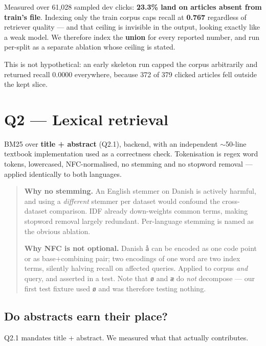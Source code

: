 \documentclass[11pt,a4paper]{article}
\newcommand{\brk}[1]{%
  \begingroup\ttfamily\hyphenchar\font=-1
  \discretionary{}{}{}%
  \expandafter\brkscan\detokenize{#1}\relax\endgroup}
\def\brkscan#1{%
  \ifx#1\relax\else
    \char`#1%
    \ifnum`#1=`/ \penalty0 \fi
    \ifnum`#1=`_ \penalty0 \fi
    \ifnum`#1=`. \penalty0 \fi
    \expandafter\brkscan
  \fi}
\begin{document}
Measured over 61,028 sampled dev clicks: \textbf{23.3\% land on articles absent from train's
file}. Indexing only the train corpus caps recall at \textbf{0.767} regardless of retriever
quality --- and that ceiling is invisible in the output, looking exactly like a weak model. We
therefore index the \textbf{union} for every reported number, and run per-split as a separate
ablation whose ceiling is stated.

This is not hypothetical: an early skeleton run capped the corpus arbitrarily and returned recall
0.0000 everywhere, because 372 of 379 clicked articles fell outside the kept slice.

\section{Q2 --- Lexical retrieval}

BM25 over \textbf{title + abstract} (Q2.1), \brk{bm25s} backend, with an independent $\sim$50-line
textbook implementation used as a correctness check. Tokenisation is regex word tokens, lowercased,
NFC-normalised, no stemming and no stopword removal --- applied identically to both languages.

\begin{quote}\small
\textbf{Why no stemming.} An English stemmer on Danish is actively harmful, and using a
\emph{different} stemmer per dataset would confound the cross-dataset comparison. IDF already
down-weights common terms, making stopword removal largely redundant. Per-language stemming is
named as the obvious ablation.

\textbf{Why NFC is not optional.} Danish \texttt{\aa} can be encoded as one code point or as
base+combining pair; two encodings of one word are two index terms, silently halving recall on
affected queries. Applied to corpus \emph{and} query, and asserted in a test. Note that
\texttt{\o} and \texttt{\ae} do \emph{not} decompose --- our first test fixture used
\texttt{\o} and was therefore testing nothing.
\end{quote}

\subsection{Do abstracts earn their place?}\label{sec:abstracts}

Q2.1 mandates title + abstract. We measured what that actually contributes.
\end{document}
